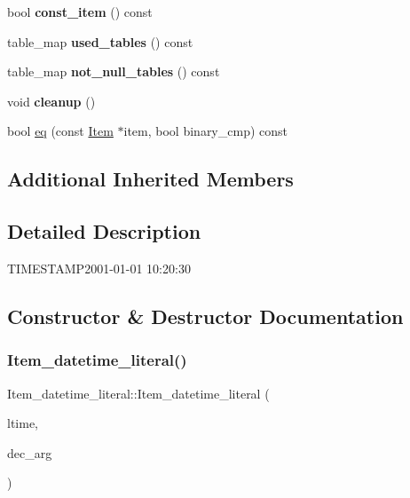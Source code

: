 \begin{DoxyCompactItemize}
bool {\bfseries const\+\_\+item} () const
\item 
\mbox{\label{classItem__datetime__literal_a8971f6b76ec421c375f7171d2b9cf3d2}} 
table\+\_\+map {\bfseries used\+\_\+tables} () const
\item 
\mbox{\label{classItem__datetime__literal_a86c1b68e907c801aeee2d6f1e98d7db0}} 
table\+\_\+map {\bfseries not\+\_\+null\+\_\+tables} () const
\item 
\mbox{\label{classItem__datetime__literal_a17ec32028367e08791e4ede1139fdc73}} 
void {\bfseries cleanup} ()
\item 
bool \mbox{\hyperlink{classItem__datetime__literal_a30ee1698b8a594542f2017e3ee6ac8ad}{eq}} (const \mbox{\hyperlink{classItem}{Item}} $\ast$item, bool binary\+\_\+cmp) const
\end{DoxyCompactItemize}
\subsection*{Additional Inherited Members}


\subsection{Detailed Description}
T\+I\+M\+E\+S\+T\+A\+MP\textquotesingle{}2001-\/01-\/01 10\+:20\+:30\textquotesingle{} 

\subsection{Constructor \& Destructor Documentation}
\mbox{\label{classItem__datetime__literal_a6a462ca295dad345d98d1fc6fa3e6f4d}} 
\subsubsection{\texorpdfstring{Item\+\_\+datetime\+\_\+literal()}{Item\_datetime\_literal()}}
{\footnotesize\ttfamily Item\+\_\+datetime\+\_\+literal\+::\+Item\+\_\+datetime\+\_\+literal (\begin{DoxyParamCaption}\item[{M\+Y\+S\+Q\+L\+\_\+\+T\+I\+ME $\ast$}]{ltime,  }\item[{uint}]{dec\+\_\+arg }\end{DoxyParamCaption})\hspace{0.3cm}{\ttfamily [inline]}}


